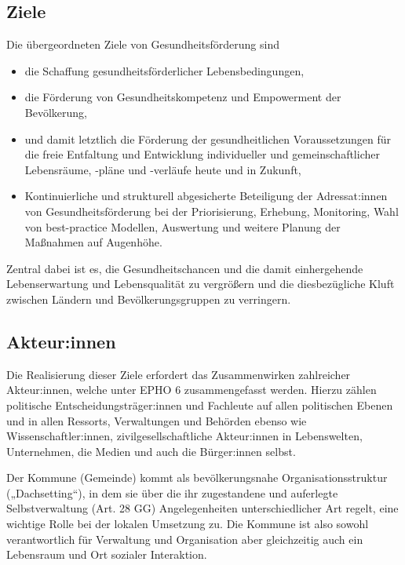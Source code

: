 \documentclass{article}
\begin{document}
\subsection{Ziele }\label{H55937}



Die übergeordneten Ziele von Gesundheitsförderung sind

\begin{itemize}
\item die Schaffung gesundheitsförderlicher Lebensbedingungen,


\item die Förderung von Gesundheitskompetenz und Empowerment der Bevölkerung,


\item und damit letztlich die Förderung der gesundheitlichen Voraussetzungen für die freie Entfaltung und Entwicklung individueller und gemeinschaftlicher Lebensräume, -pläne und -verläufe heute und in Zukunft,


\item Kontinuierliche und strukturell abgesicherte Beteiligung der Adressat:innen von Gesundheitsförderung bei der Priorisierung, Erhebung, Monitoring, Wahl von best-practice Modellen, Auswertung und weitere Planung der Maßnahmen auf Augenhöhe.


\end{itemize}

Zentral dabei ist es, die Gesundheitschancen und die damit einhergehende Lebenserwartung und Lebensqualität zu vergrößern und die diesbezügliche Kluft zwischen Ländern und Bevölkerungsgruppen zu verringern. 


\subsection{Akteur:innen}\label{H5049985}



Die Realisierung dieser Ziele erfordert das Zusammenwirken zahlreicher Akteur:innen, welche unter EPHO 6 zusammengefasst werden. Hierzu zählen politische Entscheidungsträger:innen und Fachleute auf allen politischen Ebenen und in allen Ressorts, Verwaltungen und Behörden ebenso wie Wissenschaftler:innen, zivilgesellschaftliche Akteur:innen in Lebenswelten, Unternehmen, die Medien und auch die Bürger:innen selbst. 


Der Kommune (Gemeinde) kommt als bevölkerungsnahe Organisationsstruktur („Dachsetting“), in dem sie über die ihr zugestandene und auferlegte Selbstverwaltung (Art. 28 GG) Angelegenheiten unterschiedlicher Art regelt, eine wichtige Rolle bei der lokalen Umsetzung zu. Die Kommune ist also sowohl verantwortlich für Verwaltung und Organisation aber gleichzeitig auch ein Lebensraum und Ort sozialer Interaktion.
\end{document}
